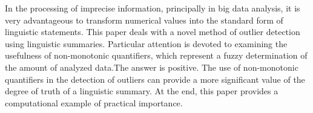 
In the processing of imprecise information, principally in big data analysis, it is very advantageous to transform numerical values into the standard form of linguistic statements. 
This paper deals with a novel method of outlier detection using linguistic summaries. Particular attention is devoted to examining the usefulness of non-monotonic quantifiers, which represent a fuzzy determination of the amount of analyzed data.The answer is positive. The use of non-monotonic quantifiers in the detection of outliers can provide a more significant value of the degree of truth of a linguistic summary. At the end, this paper provides a computational example of practical importance.


